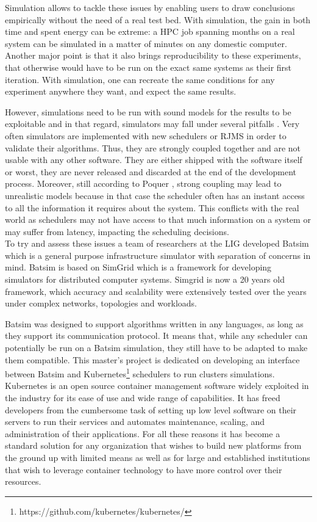 Simulation allows to tackle these issues by enabling users to draw conclusions
empirically without the need of a real test bed. With simulation, the
gain in both time and spent energy can be extreme: a HPC job spanning months on
a real system can be simulated in a matter of minutes on any domestic computer.
Another major point is that it also brings reproducibility to these
experiments, that otherwise would have to be run on the exact same systems as
their first iteration. With simulation, one can recreate the same conditions
for any experiment anywhere they want, and expect the same results.

However, simulations need to be run with sound models for the results to be
exploitable and in that regard, simulators may fall under several pitfalls
\cite{poquet:tel-01757245}. Very often simulators are implemented with new
schedulers or RJMS in order to validate their algorithms. Thus, they are
strongly coupled together and are not usable with any other software. They are
either shipped with the software itself or worst, they are never released and
discarded at the end of the development process.  Moreover, still according to
Poquer \cite{poquet:tel-01757245}, strong coupling may lead to unrealistic
models because in that case the scheduler often has an instant access to all
the information it requires about the system. This conflicts with the real
world as schedulers may not have access to that much information on a system or
may suffer from latency, impacting the scheduling decisions.\\


To try and assess these issues a team of researchers at the LIG developed
Batsim\cite{dutot:hal-01333471} which is a general purpose infrastructure
simulator with separation of concerns in mind. Batsim is based on
SimGrid\cite{casanova:hal-01017319} which is a framework for developing
simulators for distributed computer systems. Simgrid is now a 20 years old
framework, which accuracy and scalability were extensively tested over the
years under complex networks, topologies and workloads. 

Batsim was designed to support algorithms written in any languages, as long as
they support its communication protocol. It means that, while any scheduler can
potentially be run on a Batsim simulation, they still have to be adapted to
make them compatible. This master's project is dedicated on developing an
interface between Batsim and
Kubernetes\footnote{https://github.com/kubernetes/kubernetes/} schedulers to
run clusters simulations. Kubernetes is an open source container management
software widely exploited in the industry for its ease of use and wide range of
capabilities.  It has freed developers from the cumbersome task of setting up
low level software on their servers to run their services and automates
maintenance, scaling, and administration of their applications.  For all these
reasons it has become a standard solution for any organization that wishes to
build new platforms from the ground up with limited means as well as for large
and established institutions that wish to leverage container technology to have
more control over their resources.\\

